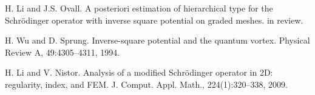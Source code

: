 \documentclass[article, A4, 11pt]{llncs}%
\begin{document}

\begin{thebibliography}{10}
{\sc H. Li and J.S. Ovall}. {A posteriori estimation of hierarchical type for the  Schr\"odinger operator with inverse square potential on graded meshes}. in review.

{\sc H. Wu and D. Sprung}. {Inverse-square potential and the quantum vortex}. Physical Review A,  49:4305–4311, 1994.

{\sc H. Li and V. Nistor}. {Analysis of a modified Schr\"odinger operator in 2D: regularity, index,  and FEM}. J. Comput. Appl. Math., 224(1):320–338, 2009.
\end{thebibliography} %
\end{document}
